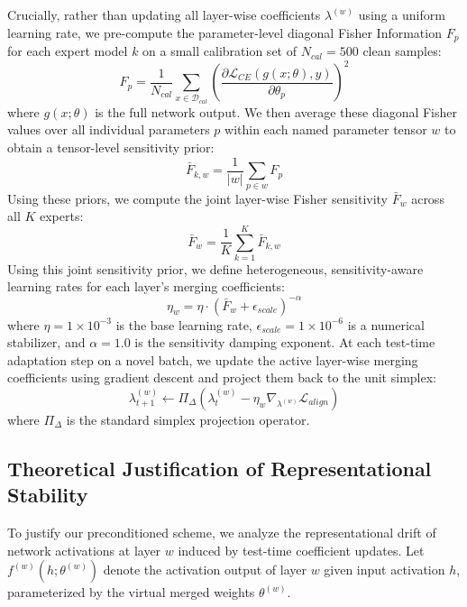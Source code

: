 \documentclass{article}
\theoremstyle{plain}
\theoremstyle{definition}
\theoremstyle{remark}
\begin{document}
Crucially, rather than updating all layer-wise coefficients $\lambda^{(w)}$ using a uniform learning rate, we pre-compute the parameter-level diagonal Fisher Information $F_p$ for each expert model $k$ on a small calibration set of $N_{cal} = 500$ clean samples:
\begin{equation}
  F_p = \frac{1}{N_{cal}} \sum_{x \in \mathcal{D}_{cal}} \left( \frac{\partial \mathcal{L}_{CE}(g(x; \theta), y)}{\partial \theta_p} \right)^2
\end{equation}
where $g(x; \theta)$ is the full network output. We then average these diagonal Fisher values over all individual parameters $p$ within each named parameter tensor $w$ to obtain a tensor-level sensitivity prior:
\begin{equation}
  \bar{F}_{k, w} = \frac{1}{|w|} \sum_{p \in w} F_p
\end{equation}
Using these priors, we compute the joint layer-wise Fisher sensitivity $\bar{F}_w$ across all $K$ experts:
\begin{equation}
  \bar{F}_w = \frac{1}{K} \sum_{k=1}^K \bar{F}_{k, w}
\end{equation}
Using this joint sensitivity prior, we define heterogeneous, sensitivity-aware learning rates for each layer's merging coefficients:
\begin{equation}
  \eta_w = \eta \cdot (\bar{F}_w + \epsilon_{scale})^{-\alpha}
\end{equation}
where $\eta = 1 \times 10^{-3}$ is the base learning rate, $\epsilon_{scale} = 1 \times 10^{-6}$ is a numerical stabilizer, and $\alpha = 1.0$ is the sensitivity damping exponent. At each test-time adaptation step on a novel batch, we update the active layer-wise merging coefficients using gradient descent and project them back to the unit simplex:
\begin{equation}
  \lambda^{(w)}_{t+1} \leftarrow \Pi_{\Delta} \left( \lambda^{(w)}_t - \eta_w \nabla_{\lambda^{(w)}} \mathcal{L}_{align} \right)
\end{equation}
where $\Pi_{\Delta}$ is the standard simplex projection operator.

\subsection{Theoretical Justification of Representational Stability}
To justify our preconditioned scheme, we analyze the representational drift of network activations at layer $w$ induced by test-time coefficient updates. Let $f^{(w)}(h; \theta^{(w)})$ denote the activation output of layer $w$ given input activation $h$, parameterized by the virtual merged weights $\theta^{(w)}$.
\end{document}
